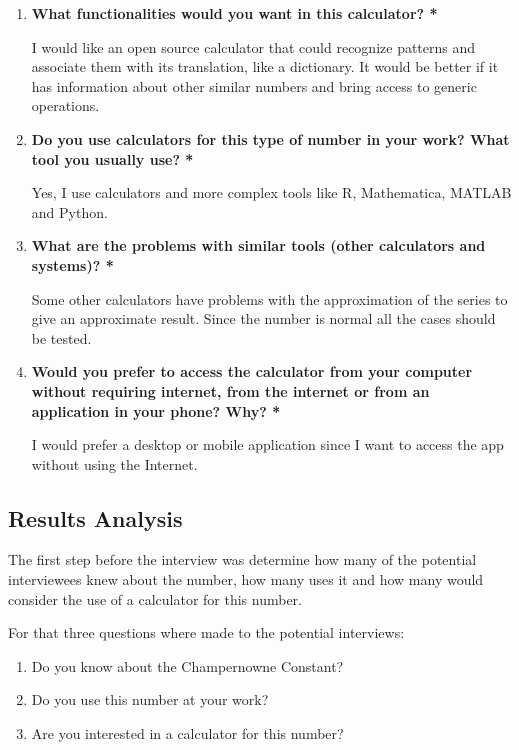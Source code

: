 \documentclass{report}
\begin{document}
\begin{enumerate}
\item\textbf{What functionalities would you want in this calculator?\color{red} *}

I would like an open source calculator that could recognize patterns and associate them with its translation, like a dictionary. It would be better if it has information about other similar numbers and bring access to generic operations. 

\item\textbf{Do you use calculators for this type of number in your work? What tool you usually use?\color{red} *}

Yes, I use calculators and more complex tools like R, Mathematica, MATLAB and Python.

\item\textbf{What are the problems with similar tools (other calculators and systems)?\color{red} *}

Some other calculators have problems with the approximation of the series to give an approximate result. Since the number is normal all the cases should be tested.

\item\textbf{Would you prefer to access the calculator from your computer without requiring internet, from the internet or from an application in your phone? Why?\color{red} *}

I would prefer a desktop or mobile application since I want to access the app without using the Internet.

\end{enumerate}

\subsection{Results Analysis} %

The first step before the interview was determine how many of the potential interviewees knew about the number, how many uses it and how many would consider the use of a calculator for this number.

For that three questions where made to the potential interviews:
\begin{enumerate}
    \item Do you know about the Champernowne Constant?
    \item Do you use this number at your work?
    \item Are you interested in a calculator for this number?
\end{enumerate}
\end{document}
